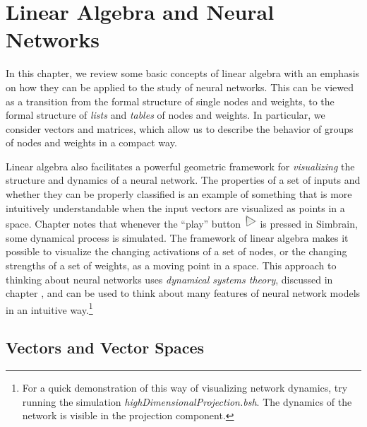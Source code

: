 \chapter{Linear Algebra and Neural Networks}\label{ch_linear_algebra}




In this chapter, we review some basic concepts of linear algebra with an 
emphasis on how they can be applied to the study of neural networks. This can be viewed as a transition from the formal structure of single nodes and weights, to the formal structure of \emph{lists} and \emph{tables} of nodes and weights. In particular, we  consider vectors and matrices, which allow us to describe the behavior of groups of nodes and weights in a compact way.

Linear algebra also facilitates a powerful geometric framework for \emph{visualizing} the structure and dynamics of a neural network. The properties of a set of inputs and whether they can be properly classified is an example of something that is  more intuitively understandable when the input vectors are visualized as points in a space. Chapter  notes that whenever the ``play''  button \includegraphics[scale=.5]{./images/Play.png} is pressed in Simbrain, some dynamical process is simulated. The framework of linear algebra makes it possible to visualize the changing activations of a set of nodes, or the changing strengths of a set of weights, as a moving point in a space. This approach to thinking about neural networks uses \emph{dynamical systems theory}, discussed in chapter , and can be used to think about many features of neural network models in an intuitive way.\footnote{For a quick demonstration of this way of visualizing network dynamics, try running the simulation \emph{highDimensionalProjection.bsh}. The dynamics of the network is visible in the projection component.}  

\section{Vectors and Vector Spaces}\label{sect_vector}

